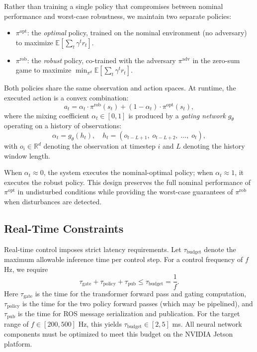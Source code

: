 \documentclass[conference]{IEEEtran}
\newcommand{\E}{\mathbb{E}}
\newcommand{\R}{\mathbb{R}}
\newcommand{\piopt}{\pi^{\text{opt}}}
\newcommand{\pirob}{\pi^{\text{rob}}}
\newcommand{\piadv}{\pi^{\text{adv}}}
\begin{document}
Rather than training a single policy that compromises between nominal
performance and worst-case robustness, we maintain two separate policies:
\begin{itemize}
\item $\piopt$: the \emph{optimal} policy, trained on the nominal
  environment (no adversary) to maximize $\E[\sum_t \gamma^t r_t]$.
\item $\pirob$: the \emph{robust} policy, co-trained with the adversary
  $\piadv$ in the zero-sum game to maximize
  $\min_{\pi^d} \E[\sum_t \gamma^t r_t]$.
\end{itemize}
Both policies share the same observation and action spaces.  At runtime,
the executed action is a convex combination:
\begin{equation}\label{eq:mixing}
a_t = \alpha_t \cdot \pirob(s_t) + (1 - \alpha_t) \cdot \piopt(s_t),
\end{equation}
where the mixing coefficient $\alpha_t \in [0,1]$ is produced by a
\emph{gating network} $g_\theta$ operating on a history of observations:
\begin{equation}\label{eq:gating}
\alpha_t = g_\theta(h_t), \quad
h_t = (o_{t-L+1},\; o_{t-L+2},\; \ldots,\; o_t),
\end{equation}
with $o_i \in \R^d$ denoting the observation at timestep $i$ and $L$
denoting the history window length.

When $\alpha_t \approx 0$, the system executes the nominal-optimal policy;
when $\alpha_t \approx 1$, it executes the robust policy.  This design
preserves the full nominal performance of $\piopt$ in undisturbed
conditions while providing the worst-case guarantees of $\pirob$ when
disturbances are detected.

\subsection{Real-Time Constraints}\label{sec:rt_constraints}

Real-time control imposes strict latency requirements.  Let
$\tau_{\text{budget}}$ denote the maximum allowable inference time per
control step.  For a control frequency of $f$ Hz, we require
\begin{equation}\label{eq:latency}
\tau_{\text{gate}} + \tau_{\text{policy}} + \tau_{\text{pub}} \leq
\tau_{\text{budget}} = \frac{1}{f}.
\end{equation}
Here $\tau_{\text{gate}}$ is the time for the transformer forward pass and
gating computation, $\tau_{\text{policy}}$ is the time for the two policy
forward passes (which may be pipelined), and $\tau_{\text{pub}}$ is the
time for ROS message serialization and publication.  For the target range
of $f \in [200, 500]$ Hz, this yields
$\tau_{\text{budget}} \in [2, 5]$ ms.  All neural network components must
be optimized to meet this budget on the NVIDIA Jetson platform.
\end{document}
